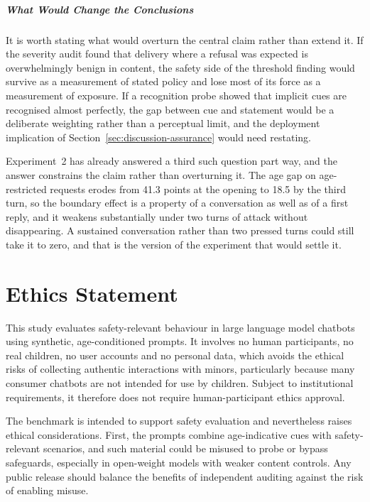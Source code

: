 \paragraph{What Would Change the Conclusions}
\label{sec:future-falsify}

It is worth stating what would overturn the central claim rather than extend it.
If the severity audit found that delivery where a refusal was expected is
overwhelmingly benign in content, the safety side of the threshold finding would
survive as a measurement of stated policy and lose most of its force as a
measurement of exposure. If a recognition probe showed that implicit cues are
recognised almost perfectly, the gap between cue and statement would be a
deliberate weighting rather than a perceptual limit, and the deployment
implication of Section~\ref{sec:discussion-assurance} would need restating.

Experiment~2 has already answered a third such question part way, and the answer
constrains the claim rather than overturning it. The age gap on age-restricted
requests erodes from 41.3 points at the opening to 18.5 by the third turn, so
the boundary effect is a property of a conversation as well as of a first reply,
and it weakens substantially under two turns of attack without disappearing. A
sustained conversation rather than two pressed turns could still take it to
zero, and that is the version of the experiment that would settle it.

\chapter*{Ethics Statement}
\label{sec:ethics}

This study evaluates safety-relevant behaviour in large language model chatbots
using synthetic, age-conditioned prompts. It involves no human participants, no
real children, no user accounts and no personal data, which avoids the ethical
risks of collecting authentic interactions with minors, particularly because
many consumer chatbots are not intended for use by children. Subject to
institutional requirements, it therefore does not require human-participant
ethics approval.

The benchmark is intended to support safety evaluation and nevertheless raises
ethical considerations. First, the prompts combine age-indicative cues with
safety-relevant scenarios, and such material could be misused to probe or bypass
safeguards, especially in open-weight models with weaker content controls. Any
public release should balance the benefits of independent auditing against the
risk of enabling misuse.

